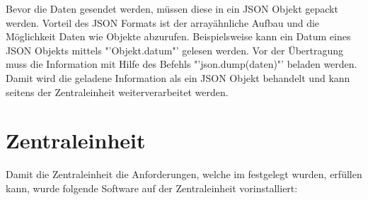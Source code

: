 Bevor die Daten gesendet werden, müssen diese in ein \ac{JSON} Objekt gepackt werden. Vorteil des \ac{JSON} Formats ist der arrayähnliche Aufbau und die Möglichkeit Daten wie Objekte abzurufen. Beispielsweise kann ein Datum eines \ac{JSON} Objekts mittels "'Objekt.datum"' gelesen werden. Vor der Übertragung muss die Information mit Hilfe des Befehls "'json.dump(daten)"' beladen werden. Damit wird die geladene Information als ein \ac{JSON} Objekt behandelt und kann seitens der Zentraleinheit weiterverarbeitet werden.

\section{Zentraleinheit}%
Damit die Zentraleinheit die Anforderungen, welche im  festgelegt wurden, erfüllen kann, wurde folgende Software auf der Zentraleinheit vorinstalliert:
